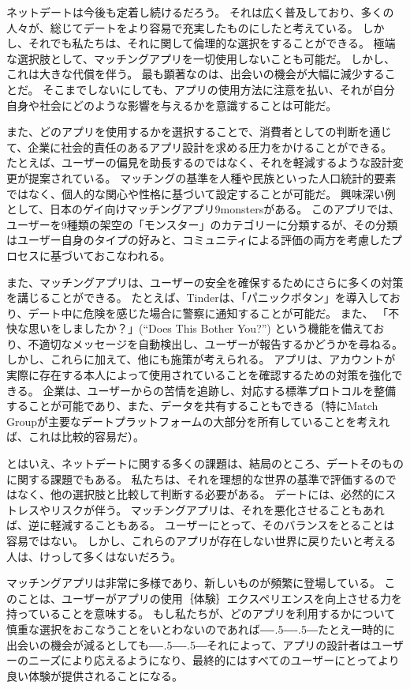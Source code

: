 \documentclass[paper=a4,book,openany]{jlreq}
\def\DDASH{―\kern-.5\zw―\kern-.5\zw―} %
\begin{document}
ネットデートは今後も定着し続けるだろう。
それは広く普及しており、多くの人々が、総じてデートをより容易で充実したものにしたと考えている。
しかし、それでも私たちは、それに関して倫理的な選択をすることができる。
極端な選択肢として、マッチングアプリを一切使用しないことも可能だ。
しかし、これは大きな代償を伴う。
最も顕著なのは、出会いの機会が大幅に減少することだ。
そこまでしないにしても、アプリの使用方法に注意を払い、それが自分自身や社会にどのような影響を与えるかを意識することは可能だ。

また、どのアプリを使用するかを選択することで、消費者としての判断を通じて、企業に社会的責任のあるアプリ設計を求める圧力をかけることができる。
たとえば、ユーザーの偏見を助長するのではなく、それを軽減するような設計変更が提案されている。
マッチングの基準を人種や民族といった人口統計的要素ではなく、個人的な関心や性格に基づいて設定することが可能だ。
興味深い例として、日本のゲイ向けマッチングアプリ{9monsters}がある。
このアプリでは、ユーザーを9種類の架空の「モンスター」のカテゴリーに分類するが、その分類はユーザー自身のタイプの好みと、コミュニティによる評価の両方を考慮したプロセスに基づいておこなわれる\citep{miksche17:_meet_gay_app,hutson18:_debias_desir}。

また、マッチングアプリは、ユーザーの安全を確保するためにさらに多くの対策を講じることができる。
たとえば、Tinderは、「パニックボタン」を導入しており、デート中に危険を感じた場合に警察に通知することが可能だ。
また、 「不快な思いをしましたか？」(``Does This Bother You?'') という機能を備えており、不適切なメッセージを自動検出し、ユーザーが報告するかどうかを尋ねる。
しかし、これらに加えて、他にも施策が考えられる。
アプリは、アカウントが実際に存在する本人によって使用されていることを確認するための対策を強化できる。
企業は、ユーザーからの苦情を追跡し、対応する標準プロトコルを整備することが可能であり、また、データを共有することもできる（特にMatch Groupが主要なデートプラットフォームの大部分を所有していることを考えれば、これは比較的容易だ）。

とはいえ、ネットデートに関する多くの課題は、結局のところ、デートそのものに関する課題でもある。
私たちは、それを理想的な世界の基準で評価するのではなく、他の選択肢と比較して判断する必要がある。
デートには、必然的にストレスやリスクが伴う。
マッチングアプリは、それを悪化させることもあれば、逆に軽減することもある。
ユーザーにとって、そのバランスをとることは容易ではない。
しかし、これらのアプリが存在しない世界に戻りたいと考える人は、けっして多くはないだろう。

マッチングアプリは非常に多様であり、新しいものが頻繁に登場している。
このことは、ユーザーがアプリの使用｛体験｝{エクスペリエンス}を向上させる力を持っていることを意味する。
もし私たちが、どのアプリを利用するかについて慎重な選択をおこなうことをいとわないのであれば{\DDASH}たとえ一時的に出会いの機会が減るとしても{\DDASH}それによって、アプリの設計者はユーザーのニーズにより応えるようになり、最終的にはすべてのユーザーにとってより良い体験が提供されることになる。
\end{document}
